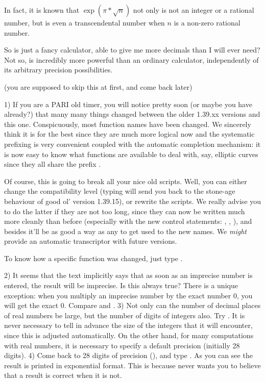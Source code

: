 In fact, it is known that $\exp(\pi*\sqrt{n})$ not only is not an integer or
a rational number, but is even a transcendental number when $n$ is a non-zero
rational number.

So  is just a fancy calculator, able to give me more decimals than I
will ever need? Not so,  is incredibly more powerful than an ordinary
calculator, independently of its arbitrary precision possibilities.

 (you are supposed to skip this at first,
and come back later)

1) If you are a PARI old timer, you will notice pretty soon (or maybe you
have already?) that many many things changed between the older 1.39.xx
versions and this one. Conspicuously, most function names have been changed.
We sincerely think it is for the best since they are much more logical now
and the systematic prefixing is very convenient coupled with the automatic
completion mechanism: it is now easy to know what functions are available to
deal with, say, elliptic curves since they all share the prefix .

Of course, this is going to break all your nice old scripts. Well, you can
either change the compatibility level (typing 
will send you back to the stone-age behaviour of good ol' version 1.39.15),
or rewrite the scripts. We really advise you to do the latter if they are not
too long, since they can now be written much more cleanly than before
(especially with the new control statements: , ,
), and besides it'll be as good a way as any to get used to the
new names. We \emph{might} provide an automatic transcriptor with future
versions.

To know how a specific function was changed, just type .

2) It seems that the text implicitly says that as soon as an imprecise number
is entered, the result will be imprecise. Is this always true? There is a
unique exception: when you multiply an imprecise number by the exact number
0, you will get the exact 0. Compare  and .
\smallskip
%
3) Not only can the number of decimal places of real numbers be large, but
the number of digits of integers also. Try . It is never necessary
to tell  in advance the size of the integers that it will encounter,
since this is adjusted automatically. On the other hand, for many
computations with real numbers, it is necessary to specify a default
precision (initially 28 digits).
\smallskip
%
4) Come back to 28 digits of precision (), and type . As you can see the result is printed in exponential format. This is
because  never wants you to believe that a result is correct when it
is not.


